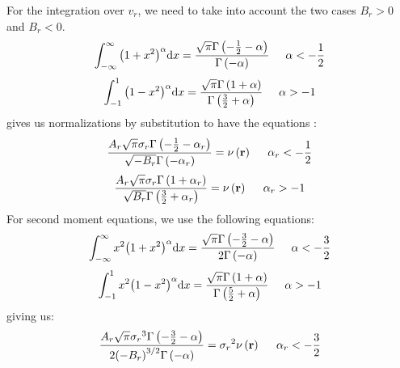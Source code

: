 For the integration over $v_r$, we need to take into account the two cases
$B_r>0$ and $B_r<0$.
%
\begin{equation}
    \int_{-\infty}^\infty{\left(1+x^2\right)}^\alpha{\rm{d}} x=
    \frac{\sqrt\pi\Gamma\left(-\frac{1}{2}-\alpha\right)}
    {\Gamma\left(-\alpha\right)}\hspace{0.5cm}\alpha<-\frac{1}{2}
\end{equation}
%
\begin{equation}
    \label{eq:ref1}
    \int_{-1}^1{\left(1-x^2\right)}^\alpha{\rm{d}} x=
    \frac{\sqrt\pi\Gamma\left(1+\alpha\right)}
    {\Gamma\left(\frac{3}{2}+\alpha\right)}\hspace{0.5cm}\alpha>-1
\end{equation}
%
 gives us normalizations by substitution to have the
equations :
%
\begin{equation}
    \frac{A_r\sqrt\pi\sigma_r\Gamma\left(-\frac{1}{2}-\alpha_r\right)}
    {\sqrt{-B_r}\Gamma\left(-\alpha_r\right)}=
    \nu\left(\textbf{r}\right)\hspace{0.5cm}\alpha_r<-\frac{1}{2}
\end{equation}
%
\begin{equation}
    \frac{A_r\sqrt\pi\sigma_r\Gamma\left(1+\alpha_r\right)}
    {\sqrt{B_r}\Gamma\left(\frac{3}{2}+\alpha_r\right)}=
    \nu\left(\textbf{r}\right)\hspace{0.5cm}\alpha_r>-1
\end{equation}
%
For second moment equations, we use the following equations:
%
\begin{equation}
    \int_{-\infty}^\infty x^2{\left(1+x^2\right)}^\alpha{\rm{d}} x=
    \frac{\sqrt\pi\Gamma\left(-\frac{3}{2}-\alpha\right)}
    {2\Gamma\left(-\alpha\right)}\hspace{0.5cm}\alpha<-\frac{3}{2}
\end{equation}
%
\begin{equation}
    \label{eq:ref2}
    \int_{-1}^1 x^2{\left(1-x^2\right)}^\alpha{\rm{d}} x=
    \frac{\sqrt\pi\Gamma\left(1+\alpha\right)}
    {\Gamma\left(\frac{5}{2}+\alpha\right)}\hspace{0.5cm}\alpha>-1
\end{equation}
%
giving us:
%
\begin{equation}
    \frac{A_r\sqrt\pi{\sigma_r}^3\Gamma\left(-\frac{3}{2}-\alpha\right)}
    {2{\left(-B_r\right)}^{3/2}\Gamma\left(-\alpha\right)}=
    {\sigma_r}^2\nu\left(\textbf{r}\right)\hspace{0.5cm}\alpha_r<-\frac{3}{2}
\end{equation}
